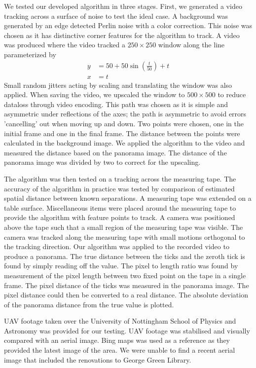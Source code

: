 We tested our developed algorithm in three stages.
First, we generated a video tracking across a surface of noise to test the ideal case.
A background was generated by an edge detected Perlin noise \cite{Perlin1985} with a color correction.
This noise was chosen as it has distinctive corner features for the algorithm to track.
A video was produced where the video tracked a $250\times250$ window along the line parameterized by
\begin{align}
  y & = 50 + 50\sin{\left(\frac{t}{50}\right)} + t \\
	x & = t 
\end{align}
Small random jitters acting by scaling and translating the window was also applied.
When saving the video, we upscaled the window to $500\times500$ to reduce dataloss through video encoding.
This path was chosen as it is simple and asymmetric under reflections of the axes;
the path is asymmetric to avoid errors 'cancelling' out when moving up and down.
Two points were chosen, one in the initial frame and one in the final frame.
The distance between the points were calculated in the background image.
We applied the algorithm to the video and measured the distance based on the panorama image. 
The distance of the panorama image was divided by two to correct for the upscaling.

The algorithm was then tested on a tracking across the measuring tape.
The accuracy of the algorithm in practice was tested by comparison of estimated spatial distance between known separations.
A measuring tape was extended on a table surface.
Miscellaneous items were placed around the measuring tape to provide the algorithm with feature points to track.
A camera was positioned above the tape such that a small region of the measuring tape was visible.
The camera was tracked along the measuring tape with small motions orthogonal to the tracking direction.
Our algorithm was applied to the recorded video to produce a panorama.
The true distance between the ticks and the zeroth tick is found by simply reading off the value.
The pixel to length ratio was found by measurement of the pixel length between two fixed point on the tape in a single frame.
The pixel distance of the ticks was measured in the panorama image.
The pixel distance could then be converted to a real distance.
The absolute deviation of the panorama distance from the true value is plotted.

UAV footage taken over the University of Nottingham School of Physics and Astronomy was provided for our testing.
UAV footage was stabilised and visually compared with an aerial image.
Bing maps was used as a reference as they provided the latest image of the area.
We were unable to find a recent aerial image that included the renovations to George Green Library.
